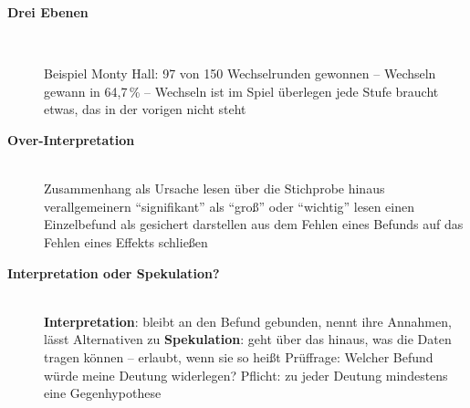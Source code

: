 \begin{description}
\item[{\rot\bf Drei Ebenen}]~\\[-\lblskip]
\begin{center}
\end{center}
\bi
  \ite Beispiel Monty Hall: 97 von 150 Wechselrunden gewonnen -- Wechseln
    gewann in 64,7\,\% -- Wechseln ist im Spiel überlegen
  \ite jede Stufe braucht etwas, das in der vorigen nicht steht
\ei
{}
\os{\newpage}

\item[{\rot\bf Over-Interpretation}]~\\[-\lblskip]
\bi
  \ite Zusammenhang als Ursache lesen
  \ite über die Stichprobe hinaus verallgemeinern
  \ite \enquote{signifikant} als \enquote{groß} oder \enquote{wichtig} lesen
  \ite einen Einzelbefund als gesichert darstellen
  \ite aus dem Fehlen eines Befunds auf das Fehlen eines Effekts schließen
\ei
\os{\newpage}

\item[{\rot\bf Interpretation oder Spekulation?}]~\\[-\lblskip]
\bi
  \ite \textbf{Interpretation}: bleibt an den Befund gebunden, nennt
    ihre Annahmen, lässt Alternativen zu
  \ite \textbf{Spekulation}: geht über das hinaus, was die Daten tragen
    können -- erlaubt, wenn sie so heißt
  \ite Prüffrage: Welcher Befund würde meine Deutung widerlegen?
  \ite Pflicht: zu jeder Deutung mindestens eine Gegenhypothese
\ei
\os{\newpage}
\end{description}


